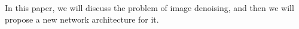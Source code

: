 In this paper, we will discuss the problem of image denoising, and then we will propose a new network architecture for it.
